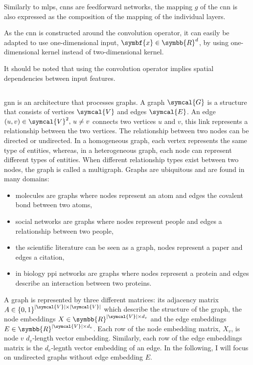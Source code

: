 \documentclass[../main.tex]{subfiles}
\begin{document}
		Similarly to \glspl{mlp}, \glspl{cnn} are feedforward networks, the mapping \(g\) of the \gls{cnn} is also expressed as the composition of the mapping of the individual layers.

		As the \gls{cnn} is constructed around the convolution operator, it can easily be adapted to use one-dimensional input, \(\symbf{x} \in \symbb{R}^d\), by using one-dimensional kernel instead of two-dimensional kernel.

		It should be noted that using the convolution operator implies spatial dependencies between input features.

	\subsection{}
		\Gls{gnn} is an architecture that processes graphs.
		A graph \(\symcal{G}\) is a structure that consists of vertices \(\symcal{V}\) and edges \(\symcal{E}\).
		An edge \(\left(u,v\right) \in \symcal{V}^2,\, u\neq v\) connects two vertices \(u\) and \(v\), this link represents a relationship between the two vertices.
		The relationship between two nodes can be directed or undirected.
		In a homogeneous graph, each vertex represents the same type of entities, whereas, in a heterogeneous graph, each node can represent different types of entities.
		When different relationship types exist between two nodes, the graph is called a multigraph.
		Graphs are ubiquitous and are found in many domains:
		\begin{itemize}[nosep]
			\item molecules are graphs where nodes represent an atom and edges the covalent bond between two atoms,
			\item social networks are graphs where nodes represent people and edges a relationship between two people,
			\item the scientific literature can be seen as a graph, nodes represent a paper and edges a citation,
			\item in biology \gls{ppi} networks are graphs where nodes represent a protein and edges describe an interaction between two proteins.
		\end{itemize}

		A graph is represented by three different matrices: its adjacency matrix \(A \in {\left\{0,1\right\}}^{\left|\symcal{V}\right| \times \left|\symcal{V}\right|}\) which describe the structure of the graph, the node embeddings \(X \in \symbb{R}^{\left|\symcal{V}\right| \times d_v}\) and the edge embeddings \(E \in \symbb{R}^{\left|\symcal{V}\right| \times d_e}\).
		Each row of the node embedding matrix, \(X_{v}\), is node \(v\) \(d_v\)-length vector embedding.
		Similarly, each row of the edge embeddings matrix is the \(d_e\)-legnth vector embedding of an edge.
		In the following, I will focus on undirected graphs without edge embedding \(E\).
\end{document}
